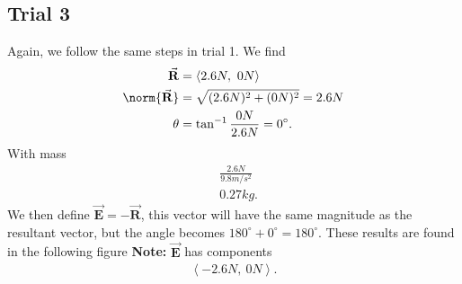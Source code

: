\documentclass{report}
\begin{document}
    \subsection{Trial 3}
    \bigbreak \noindent 
    Again, we follow the same steps in trial 1. We find 
    \begin{align*}
        \vec{\mathbf{R}} &= \left\langle 2.6N,\ 0N \right\rangle \\
        \norm{\vec{\mathbf{R}}} &= \sqrt{(2.6N)^{2} + (0N)^{2}} =2.6N \\
        \theta  &= \tan^{-1}{\frac{0N}{2.6N}} = 0^{\circ}
    .\end{align*}
    \bigbreak \noindent 
    With mass
    \begin{align*}
        &\frac{2.6N}{9.8m/s^{2}} \\
        &0.27kg
    .\end{align*}
    \bigbreak \noindent 
    We then define $\vec{\mathbf{E}} = -\vec{\mathbf{R}}$, this vector will have the same magnitude as the resultant vector, but the angle becomes $180^{\circ} +  0^{\circ} = 180^{\circ}$. These results are found in the following figure
    \bigbreak \noindent 
    \textbf{Note:} $\vec{\mathbf{E}}$ has components 
    \begin{align*}
        \left\langle -2.6N,\ 0N \right\rangle
    .\end{align*}
    \pagebreak \bigbreak \noindent 
    \begin{figure}[ht]
        \centering
        \label{fig:fig11}
    \end{figure}
    \bigbreak \noindent 


    \bigbreak \noindent 
\end{document}
